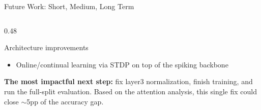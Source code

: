 \documentclass[aspectratio=169,11pt]{beamer}
\begin{document}
\begin{frame}[shrink=12]{Future Work: Short, Medium, Long Term}
\begin{columns}[T]
\begin{column}{0.48\textwidth}
\begin{exampleblock}{Architecture improvements}
\begin{itemize}
      \item Online/continual learning via STDP on top of the spiking backbone
    \end{itemize}
  \end{exampleblock}
  \vspace{0.3em}
  \begin{tcolorbox}[mybox]
    \scriptsize
    \textbf{The most impactful next step:}
    fix layer3 normalization, finish training, and run the full-split evaluation.
    Based on the attention analysis, this single fix could close $\sim$5pp of the accuracy gap.
  \end{tcolorbox}
\end{column}
\end{columns}
\end{frame}

\end{document}
